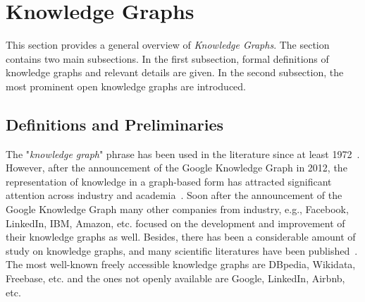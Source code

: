 \section{Knowledge Graphs}
\label{cha:foundations_basics_kb}
This section provides a general overview of \textit{Knowledge Graphs}.  The section contains two main subsections. In the first subsection, formal definitions of knowledge graphs and relevant details are given. In the second subsection, the most prominent open knowledge graphs are introduced.  
\subsection{Definitions and Preliminaries}
The "\textit{knowledge graph}" phrase has been used in the literature since at least 1972~\cite{hogan2020knowledge}. However, after the announcement of the Google Knowledge Graph in 2012, the representation of knowledge in a graph-based form has attracted significant attention across industry and academia~\cite{DBLP:journals/semweb/Paulheim17}. Soon after the announcement of the Google Knowledge Graph many other companies from industry, e.g., Facebook, LinkedIn, IBM, Amazon, etc. focused on the development and improvement of their knowledge graphs as well. Besides, there has been a considerable amount of study on knowledge graphs, and many scientific literatures have been published~\cite{hogan2020knowledge,DBLP:journals/semweb/Paulheim17,def_of_KGs_16,farber2015comparative}. The most well-known freely accessible knowledge graphs are DBpedia, Wikidata, Freebase, etc. and the ones not openly available are Google, LinkedIn, Airbnb, etc.

